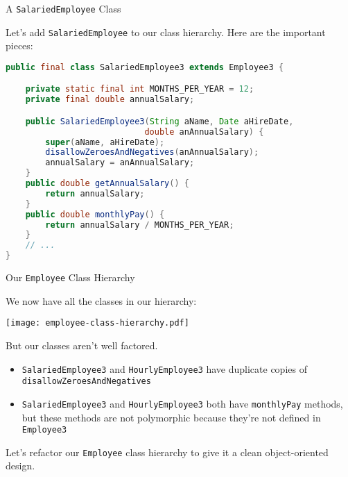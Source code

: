 \documentclass{beamer}
\begin{document}
\begin{frame}[fragile]{A {\tt SalariedEmployee} Class}


Let's add {\tt SalariedEmployee} to our class hierarchy.  Here are the important pieces:
\begin{lstlisting}[language=Java]
public final class SalariedEmployee3 extends Employee3 {

    private static final int MONTHS_PER_YEAR = 12;
    private final double annualSalary;

    public SalariedEmployee3(String aName, Date aHireDate,
                            double anAnnualSalary) {
        super(aName, aHireDate);
        disallowZeroesAndNegatives(anAnnualSalary);
        annualSalary = anAnnualSalary;
    }
    public double getAnnualSalary() {
        return annualSalary;
    }
    public double monthlyPay() {
        return annualSalary / MONTHS_PER_YEAR;
    }
    // ...
}
\end{lstlisting}

\end{frame}

\begin{frame}[fragile]{Our {\tt Employee} Class Hierarchy}


We now have all the classes in our hierarchy:
\vspace{-.1in}
\begin{center}
\texttt{[image: employee-class-hierarchy.pdf]}
\end{center}
\vspace{-.2in}
But our classes aren't well factored.
\begin{itemize}
\item {\tt SalariedEmployee3} and {\tt HourlyEmployee3} have duplicate copies of {\tt disallowZeroesAndNegatives}
\item {\tt SalariedEmployee3} and {\tt HourlyEmployee3} both have {\tt monthlyPay} methods, but these methods are not polymorphic because they're not defined in {\tt Employee3}
\end{itemize}

Let's refactor our {\tt Employee} class hierarchy to give it a clean object-oriented design.

\end{frame}
\end{document}
